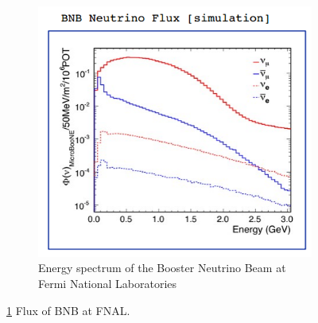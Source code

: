 \begin{figure}[htp!]
\begin{subfigure}[b]{.4\textwidth}
	\includegraphics[width=\textwidth]{figs/bnbflux.png}
	\caption{Energy spectrum of the Booster Neutrino Beam at Fermi National Laboratories}
	\label{fig:bnbflux}
	\end{subfigure}
	\quad
\label{fig:figures}
\caption{\ref{fig:bnbflux} Flux of BNB at FNAL.}
\end{figure}
